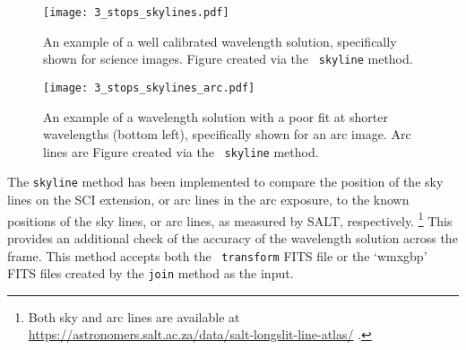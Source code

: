 \begin{figure}[t]
    \centering
    \texttt{[image: 3\_stops\_skylines.pdf]}
    \caption{
        An example of a well calibrated wavelength solution, specifically shown for science images.
        Figure created via the \stops\ \texttt{skyline} method.
    }
    \label{fig:stops_sky_eg}
\end{figure}
\begin{figure}[t]
    \centering
    \texttt{[image: 3\_stops\_skylines\_arc.pdf]}
    \caption{
        An example of a wavelength solution with a poor fit at shorter wavelengths (bottom left), specifically shown for an arc image.
        Arc lines are Figure created via the \stops\ \texttt{skyline} method.
    }
    \label{fig:stops_sky_arc_eg}
\end{figure}

The \texttt{skyline} method has been implemented to compare the position of the sky lines on the \gls{SCI} extension, or arc lines in the arc exposure, to the known positions of the sky lines, or arc lines, as measured by \gls{SALT}, respectively.%
\footnote{Both sky and arc lines are available at \url{https://astronomers.salt.ac.za/data/salt-longslit-line-atlas/} .}
This provides an additional check of the accuracy of the wavelength solution across the frame.
This method accepts both the \iraf\ \texttt{transform} \gls{FITS} file or the `wmxgbp' \gls{FITS} files created by the \texttt{join} method as the input.


